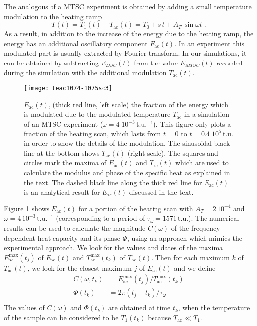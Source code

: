 \documentclass[pre,a4paper,twocolumn,superscriptaddress,%
floatfix]{revtex4}
\newcommand{\tac}{\ensuremath{T_{\mathrm{ac}}}}
\newcommand{\dtac}{\ensuremath{A_T}}
\begin{document}
\medskip
The analogous of a MTSC experiment is obtained by adding a small temperature
modulation to the heating ramp
\begin{equation}
  \label{eq:ramp}
  T(t) = T_1(t) + \tac(t) = T_0 + s\, t + \dtac \, \sin \omega t \; .
\end{equation}
As a result, in addition to the increase of the energy due to the heating
ramp, the energy has an additional oscillatory component
$E_{\mathrm{ac}}(t)$. In an experiment this modulated part is usually
extracted by Fourier transform. In our simulations, it can be obtained by
subtracting $E_{DSC}(t)$ from the value $E_{MTSC}(t)$ recorded during the
simulation with the additional modulation $\tac(t)$.

\begin{figure}[h]
  \centering
  \texttt{[image: teac1074-1075sc3]}
  \caption{$E_{\mathrm{ac}}(t)$, (thick red line, left scale)
    the fraction of the energy which is modulated
    due to the modulated temperature $\tac$ in a simulation of an MTSC
    experiment ($\omega = 4\;10^{-3}\,$t.u.$^{-1}$).
    This figure only plots a fraction of the heating scan, which
    lasts from $t=0$ to $t=0.4 \; 10^5\,$t.u.
    in order to show the details of the
    modulation. The sinusoidal black line at the bottom shows $\tac(t)$ (right
    scale). The squares and circles mark the maxima of $E_{\mathrm{ac}}(t)$ and
    $\tac(t)$ which are used to calculate the modulus and phase of the
    specific heat as explained in the text. The dashed black line along the
    thick red line for $E_{\mathrm{ac}}(t)$ is an analytical result
    for $E_{\mathrm{ac}}(t)$ discussed in the text. }
  \label{fig:eac}
\end{figure}

Figure \ref{fig:eac} shows $E_{\mathrm{ac}}(t)$ for a portion of the heating
scan with $\dtac = 2\,10^{-4}$ and $\omega = 4\,10^{-3}\,$t.u.$^{-1}$
(corresponding to a period of $ \tau_{\omega} = 1571\,$t.u.).
The numerical results can be used
to calculate the magnitude $C(\omega)$ of the frequency-dependent heat
capacity and its phase $\Phi$,
using an approach which mimics the experimental approach. We look for
the values and dates of the maxima  $E_{\mathrm{ac}}^{\mathrm{max}}(t_j)$
of $E_{\mathrm{ac}}(t)$ and $T_{\mathrm{ac}}^{\mathrm{max}}(t_k)$ of
$\tac(t)$. Then for each maximum $k$ of $\tac(t)$, we look for the closest
maximum $j$ of $E_{\mathrm{ac}}(t)$ and we define
\begin{align}
  \label{eq:ampliphase}
  C(\omega,t_k) &=
  E_{\mathrm{ac}}^{\mathrm{max}}(t_j)/T_{\mathrm{ac}}^{\mathrm{max}}(t_k)
  \nonumber \\                
  \Phi(t_k) &= 2 \pi (t_j - t_k) /  \tau_{\omega}
  \nonumber \\               
\end{align}
The values of $C(\omega)$ and $\Phi(t_k)$ are obtained at time $t_k$,
when the temperature of the sample can be considered to be $T_1(t_k)$
because $\tac \ll T_1$.
\end{document}
